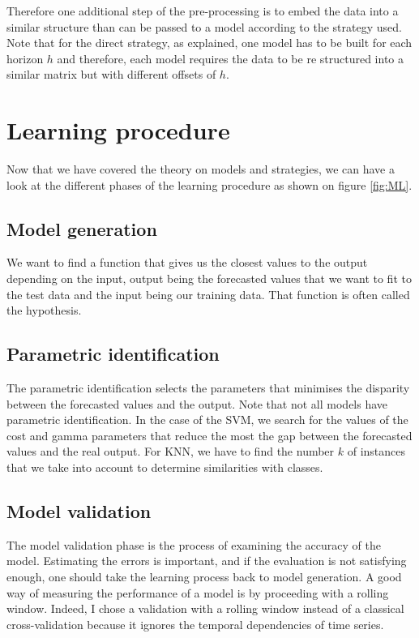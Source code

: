 \documentclass[11pt,a4paper,oneside]{book}
\begin{document}
Therefore one additional step of the pre-processing is to embed the data into a similar structure than can be passed to a model according to the strategy used. Note that for the direct strategy, as explained, one model has to be built for each horizon $h$ and therefore, each model requires the data to be re structured into a similar matrix but with different offsets of $h$.



\section{Learning procedure}

Now that we have covered the theory on models and strategies, we can have a look at the different phases of the learning procedure as shown on figure \ref{fig:ML}.


\subsection{Model generation}

We want to find a function that gives us the closest values to the output depending on the input, output being the forecasted values that we want to fit to the test data and the input being our training data. That function is often called the hypothesis. \cite{BenTaieb}


\subsection{Parametric identification}

The parametric identification selects the parameters that minimises the disparity between the forecasted values and the output. Note that not all models have parametric identification. In the case of the SVM, we search for the values of the cost and gamma parameters that reduce the most the gap between the forecasted values and the real output. For KNN, we have to find the number $k$ of instances that we take into account to determine similarities with classes. \cite{BenTaieb}


\subsection{Model validation}

The model validation phase is the process of examining the accuracy of the model. Estimating the errors is important, and if the evaluation is not satisfying enough, one should take the learning process back to model generation. A good way of measuring the performance of a model is by proceeding with a rolling window. Indeed, I chose a validation with a rolling window instead of a classical cross-validation because it ignores the temporal dependencies of time series. \cite{BenTaieb}
\end{document}
